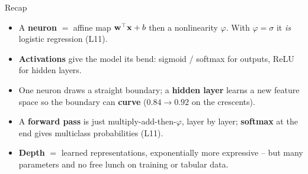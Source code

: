 \documentclass[aspectratio=169]{beamer}
\begin{document}
\begin{frame}{Recap}
  \begin{itemize}\small
    \item A \textbf{neuron} $=$ affine map $\mathbf{w}^\top\mathbf{x} + b$ then a nonlinearity
      $\varphi$. With $\varphi=\sigma$ it \emph{is} logistic regression (L11).
    \item \textbf{Activations} give the model its bend: sigmoid / softmax for outputs, ReLU
      for hidden layers.
    \item One neuron draws a straight boundary; a \textbf{hidden layer} learns a new feature
      space so the boundary can \textbf{curve} ($0.84 \to 0.92$ on the crescents).
    \item A \textbf{forward pass} is just multiply-add-then-$\varphi$, layer by layer;
      \textbf{softmax} at the end gives multiclass probabilities (L11).
    \item \textbf{Depth} $=$ learned representations, exponentially more expressive -- but
      many parameters and no free lunch on training or tabular data.
  \end{itemize}
  \vfill
\end{frame}
\end{document}
